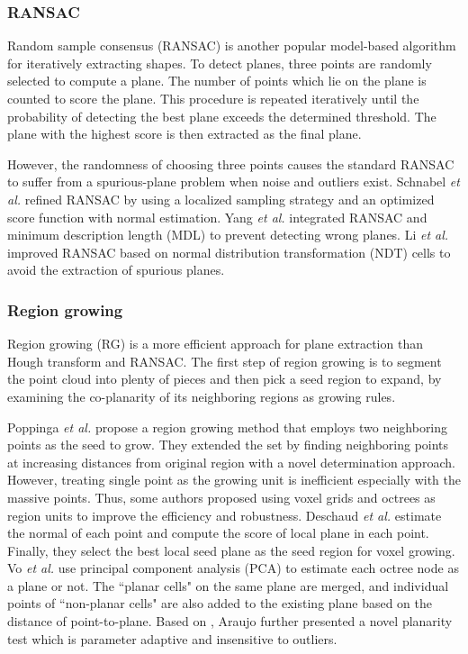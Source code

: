 \documentclass[letterpaper, 10 pt, conference]{ieeeconf}  %
\begin{document}
\subsubsection{RANSAC}

Random sample consensus (RANSAC) \cite{fischler1981random} is another popular model-based algorithm for iteratively extracting shapes. To detect planes, three points are randomly selected to compute a plane. The number of points which lie on the plane is counted to score the plane. This procedure is repeated iteratively until the probability of detecting the best plane exceeds the determined threshold. The plane with the highest score is then extracted as the final plane.

However, the randomness of choosing three points causes the standard RANSAC to suffer from a spurious-plane problem when noise and outliers exist. Schnabel \textit{et al.} \cite{schnabel2007efficient} refined RANSAC by using a localized sampling strategy and an optimized score function with normal estimation. Yang \textit{et al.} \cite{yang2010plane} integrated RANSAC and minimum description length (MDL) to prevent detecting wrong planes. Li \textit{et al.} \cite{li2017improved} improved RANSAC based on normal distribution transformation (NDT) cells to avoid the extraction of spurious planes. 


\subsubsection{Region growing}

Region growing (RG) is a more efficient approach for plane extraction than Hough transform and RANSAC. The first step of region growing is to segment the point cloud into plenty of pieces and then pick a seed region to expand, by examining the co-planarity of its neighboring regions as growing rules. 

Poppinga \textit{et al.} \cite{poppinga2008fast} propose a region growing method that employs two {neighboring} points as the seed to grow. They extended the set by finding neighboring points at increasing distances from original region with a novel determination approach. However, treating single point as the growing unit is inefficient especially with the massive points. Thus, some authors proposed using voxel grids and octrees as region units to improve the efficiency and robustness. Deschaud \textit{et al.} \cite{deschaud2010fast} estimate the normal of each point and compute the score of local plane in each point. Finally, they select the best local seed plane as the seed region for voxel growing. Vo \textit{et al.} \cite{vo2015octree} use principal component analysis (PCA) to estimate each octree node as a plane or not. The ``planar cells" on the same plane are merged, and individual points of ``non-planar cells" are also added to the existing plane based on the distance of point-to-plane. Based on \cite{vo2015octree}, Araujo \cite{araujo2020robust} further presented a novel planarity test which is parameter adaptive and insensitive to outliers. 
\end{document}
